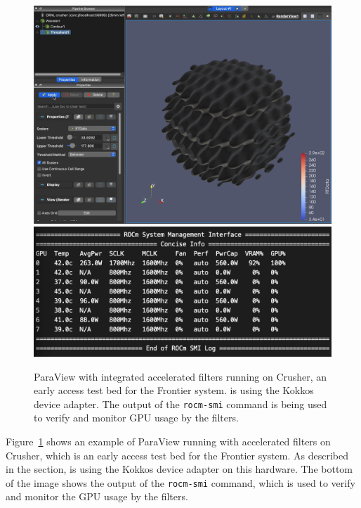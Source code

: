 \begin{figure}[t]
  \includegraphics[width=\linewidth]{figures/paraview-crusher.png}
  \includegraphics[width=\linewidth]{figures/threshold-vtkm-gpu-usage-crusher-small.png}
  \caption{
    ParaView with integrated \vtkm accelerated filters running on Crusher, an early access test bed for the Frontier system.
    \vtkm is using the Kokkos device adapter.
    The output of the \texttt{rocm-smi} command is being used to verify and monitor GPU usage by the filters.
  }
  \label{fig:paraview-crusher}
\end{figure}

Figure~\ref{fig:paraview-crusher} shows an example of ParaView running with \vtkm accelerated filters on Crusher, which is an early access test bed for the Frontier system.
As described in the  section, \vtkm is using the Kokkos device adapter on this hardware.
The bottom of the image shows the output of the \texttt{rocm-smi} command, which is used to verify and monitor the GPU usage by the filters.


